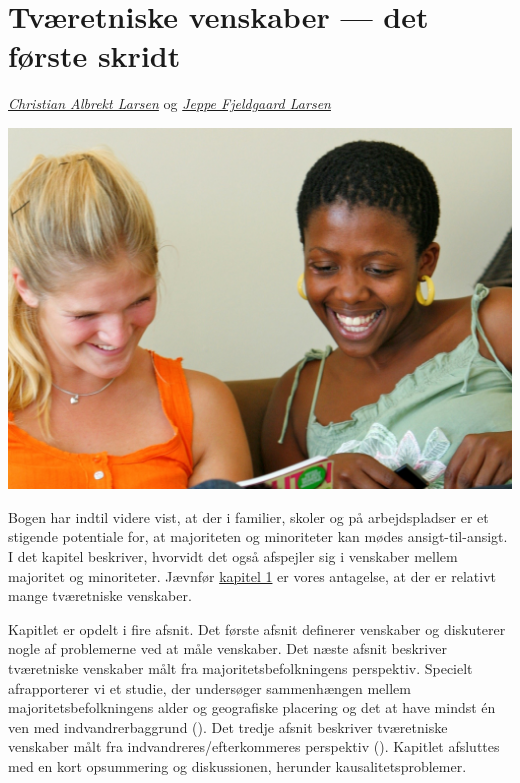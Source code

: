 \documentclass[
]{book}
\begin{document}
\chapter{Tværetniske venskaber --- det første skridt}\label{kap6}

\emph{\href{https://vbn.aau.dk/en/persons/albrekt}{Christian Albrekt Larsen}} og \emph{\href{https://vbn.aau.dk/da/persons/jeppefl}{Jeppe Fjeldgaard Larsen}}

\includegraphics[width=1\linewidth]{images/kap71}

Bogen har indtil videre vist, at der i familier, skoler og på arbejdspladser er et stigende potentiale for, at majoriteten og minoriteter kan mødes ansigt-til-ansigt. I det kapitel beskriver, hvorvidt det også afspejler sig i venskaber mellem majoritet og minoriteter. Jævnfør \hyperref[kap1]{kapitel 1} er vores antagelse, at der er relativt mange tværetniske venskaber.

Kapitlet er opdelt i fire afsnit. Det første afsnit definerer venskaber og diskuterer nogle af problemerne ved at måle venskaber. Det næste afsnit beskriver tværetniske venskaber målt fra majoritetsbefolkningens perspektiv. Specielt afrapporterer vi et studie, der undersøger sammenhængen mellem majoritetsbefolkningens alder og geografiske placering og det at have mindst én ven med indvandrerbaggrund (). Det tredje afsnit beskriver tværetniske venskaber målt fra indvandreres/efterkommeres perspektiv (). Kapitlet afsluttes med en kort opsummering og diskussionen, herunder kausalitetsproblemer.
\end{document}
